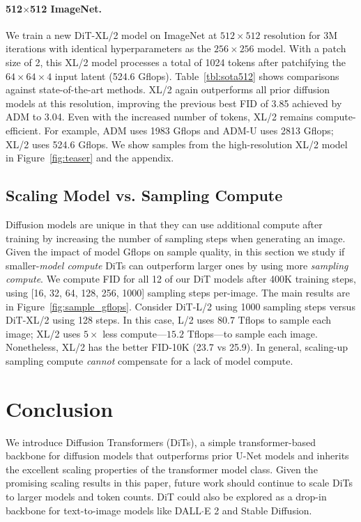 \documentclass[10pt,twocolumn,letterpaper]{article}
\begin{document}
\paragraph{512$\times$512 ImageNet.} 
We train a new DiT-XL/2 model on ImageNet at $512\times512$ resolution for 3M iterations with identical hyperparameters as the $256\times256$ model. With a patch size of 2, this XL/2 model processes a total of 1024 tokens after patchifying the $64\times64\times4$ input latent (524.6 Gflops). Table~\ref{tbl:sota512} shows comparisons against state-of-the-art methods. XL/2 again outperforms all prior diffusion models at this resolution, improving the previous best FID of 3.85 achieved by ADM to 3.04. Even with the increased number of tokens, XL/2 remains compute-efficient. For example, ADM uses 1983 Gflops and ADM-U uses 2813 Gflops; XL/2 uses 524.6 Gflops. We show samples from the high-resolution XL/2 model in Figure~\ref{fig:teaser} and the appendix.

\subsection{Scaling Model vs. Sampling Compute}
Diffusion models are unique in that they can use additional compute after training by increasing the number of sampling steps when generating an image. Given the impact of model Gflops on sample quality, in this section we study if smaller-\textit{model compute} DiTs can outperform larger ones by using more \textit{sampling compute}. We compute FID for all 12 of our DiT models after 400K training steps, using [16, 32, 64, 128, 256, 1000] sampling steps per-image. The main results are in Figure~\ref{fig:sample_gflops}. Consider DiT-L/2 using 1000 sampling steps versus DiT-XL/2 using 128 steps. In this case, L/2 uses $80.7$ Tflops to sample each image; XL/2 uses $5\times$ less compute---$15.2$ Tflops---to sample each image. Nonetheless, XL/2 has the better FID-10K (23.7 vs 25.9). In general, scaling-up sampling compute \textit{cannot} compensate for a lack of model compute.
\vspace{-1mm}

\section{Conclusion}
We introduce Diffusion Transformers (DiTs), a simple transformer-based backbone for diffusion models that outperforms prior U-Net models and inherits the excellent scaling properties of the transformer model class. Given the promising scaling results in this paper, future work should continue to scale DiTs to larger models and token counts. DiT could also be explored as a drop-in backbone for text-to-image models like DALL$\cdot$E 2 and Stable Diffusion.
\end{document}
